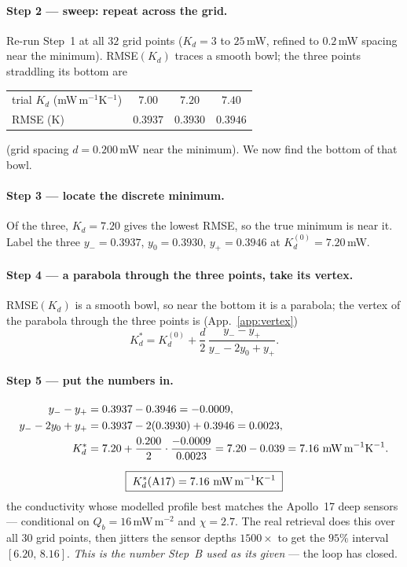 \documentclass[11pt]{report}
\begin{document}
\paragraph{Step 2 --- sweep: repeat across the grid.}
Re-run Step~1 at all $32$ grid points ($K_d=3$ to $25$\,mW, refined to $0.2$\,mW spacing
near the minimum). RMSE$(K_d)$ traces a smooth
bowl; the three points straddling its bottom are
\begin{center}\small
\begin{tabular}{@{}lccc@{}}
\toprule
trial $K_d$ (mW\,m$^{-1}$K$^{-1}$) & $7.00$ & $\mathbf{7.20}$ & $7.40$ \\
RMSE (K) & $0.3937$ & $\mathbf{0.3930}$ & $0.3946$ \\
\bottomrule
\end{tabular}
\end{center}
(grid spacing $d=0.200$\,mW near the minimum). We now find the bottom of that bowl.

\paragraph{Step 3 --- locate the discrete minimum.} Of the three, $K_d=7.20$ gives the
lowest RMSE, so the true minimum is near it. Label the three
$y_-=0.3937$, $y_0=0.3930$, $y_+=0.3946$ at $K_d^{(0)}=7.20$\,mW.

\paragraph{Step 4 --- a parabola through the three points, take its vertex.} RMSE$(K_d)$
is a smooth bowl, so near the bottom it is a parabola; the vertex of the parabola through
the three points is (App.~\ref{app:vertex})
\[
K_d^{*}=K_d^{(0)}+\frac{d}{2}\,\frac{y_--y_+}{y_--2y_0+y_+}.
\]

\paragraph{Step 5 --- put the numbers in.}
\begin{align*}
y_--y_+&=0.3937-0.3946=-0.0009,\\
y_--2y_0+y_+&=0.3937-2(0.3930)+0.3946=0.0023,\\
K_d^{*}&=7.20+\frac{0.200}{2}\cdot\frac{-0.0009}{0.0023}
        =7.20-0.039=7.16\ \text{mW\,m}^{-1}\text{K}^{-1}.
\end{align*}

\begin{keypt}[title={Answer}]
\[
\boxed{\;K_d^{*}(\mathrm{A17})=7.16\ \text{mW\,m}^{-1}\text{K}^{-1}\;}
\]
the conductivity whose modelled profile best matches the Apollo~17 deep sensors ---
conditional on $Q_b=16$\,mW\,m$^{-2}$ and $\chi=2.7$. The real retrieval does this over
all $30$ grid points, then jitters the sensor depths $1500\times$ to get the $95\%$
interval $[6.20,\,8.16]$. \emph{This is the number Step~B used as its given} ---
the loop has closed.
\end{keypt}
\end{document}
